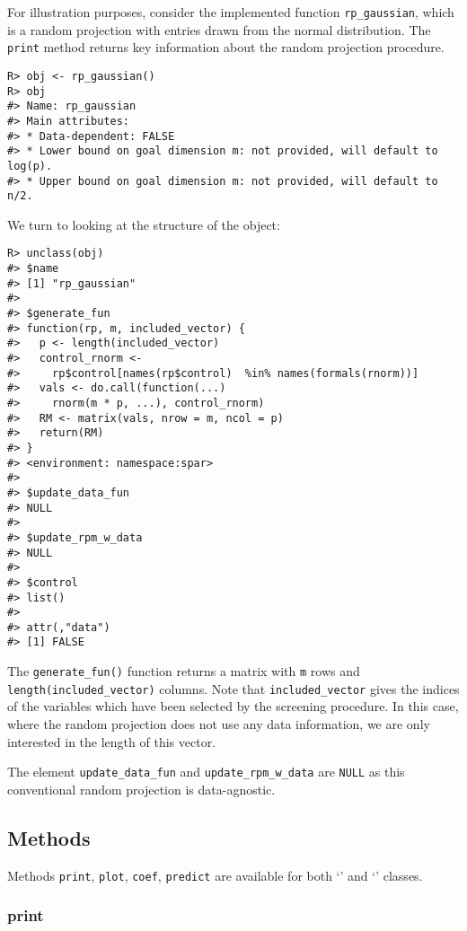 \documentclass[
  article]{jss}
\newcommand{\class}[1]{`\code{#1}'}
\begin{document}
For illustration purposes, consider the implemented function
\texttt{rp\_gaussian}, which is a random projection with entries drawn
from the normal distribution. The \texttt{print} method returns key
information about the random projection procedure.

\begin{verbatim}
R> obj <- rp_gaussian()
R> obj
#> Name: rp_gaussian 
#> Main attributes: 
#> * Data-dependent: FALSE 
#> * Lower bound on goal dimension m: not provided, will default to log(p). 
#> * Upper bound on goal dimension m: not provided, will default to n/2.
\end{verbatim}

We turn to looking at the structure of the object:

\begin{verbatim}
R> unclass(obj)
#> $name
#> [1] "rp_gaussian"
#> 
#> $generate_fun
#> function(rp, m, included_vector) {
#>   p <- length(included_vector)
#>   control_rnorm <-
#>     rp$control[names(rp$control)  %in% names(formals(rnorm))]
#>   vals <- do.call(function(...)
#>     rnorm(m * p, ...), control_rnorm)
#>   RM <- matrix(vals, nrow = m, ncol = p)
#>   return(RM)
#> }
#> <environment: namespace:spar>
#> 
#> $update_data_fun
#> NULL
#> 
#> $update_rpm_w_data
#> NULL
#> 
#> $control
#> list()
#> 
#> attr(,"data")
#> [1] FALSE
\end{verbatim}

The \texttt{generate\_fun()} function returns a matrix with \texttt{m}
rows and \texttt{length(included\_vector)} columns. Note that
\texttt{included\_vector} gives the indices of the variables which have
been selected by the screening procedure. In this case, where the random
projection does not use any data information, we are only interested in
the length of this vector.

The element \texttt{update\_data\_fun} and \texttt{update\_rpm\_w\_data}
are \texttt{NULL} as this conventional random projection is
data-agnostic.

\subsection{Methods}\label{methods}

Methods \texttt{print}, \texttt{plot}, \texttt{coef}, \texttt{predict}
are available for both \class{spar} and \class{spar.cv} classes.

\subsubsection{print}\label{print}
\end{document}
